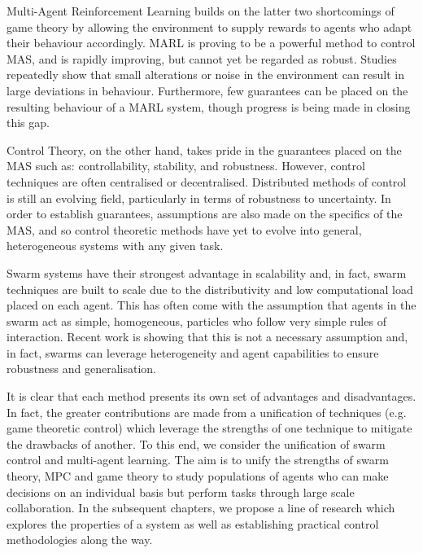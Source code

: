 \documentclass[.../main.tex]{subfiles}
\begin{document}
Multi-Agent Reinforcement Learning builds on the latter two shortcomings of game theory by allowing
the environment to supply rewards to agents who adapt their behaviour accordingly. MARL is proving
to be a powerful method to control MAS, and is rapidly improving, but cannot yet be regarded as
robust. Studies repeatedly show that small alterations or noise in the environment can result in
large deviations in behaviour. Furthermore, few guarantees can be placed on the resulting behaviour
of a MARL system, though progress is being made in closing this gap.

Control Theory, on the other hand, takes pride in the guarantees placed on the MAS such as:
controllability, stability, and robustness. However, control techniques are often centralised or
decentralised. Distributed methods of control is still an evolving field, particularly in terms of
robustness to uncertainty. In order to establish guarantees, assumptions are also made on the
specifics of the MAS, and so control theoretic methods have yet to evolve into general,
heterogeneous systems with any given task.

Swarm systems have their strongest advantage in scalability and, in fact, swarm techniques are built
to scale due to the distributivity and low computational load placed on each agent. This has often
come with the assumption that agents in the swarm act as simple, homogeneous, particles who follow
very simple rules of interaction. Recent work is showing that this is not a necessary assumption
and, in fact, swarms can leverage heterogeneity and agent capabilities to ensure robustness and
generalisation.

It is clear that each method presents its own set of advantages and disadvantages. In fact, the
greater contributions are made from a unification of techniques (e.g. game theoretic control) which
leverage the strengths of one technique to mitigate the drawbacks of another. To this end, we
consider the unification of swarm control and multi-agent learning. The aim is to unify the
strengths of swarm theory, MPC and game theory to study populations of agents who can make
decisions on an individual basis but perform tasks through large scale collaboration. In the
subsequent chapters, we propose a line of research which explores the properties of a system as well
as establishing practical control methodologies along the way.
\end{document}
